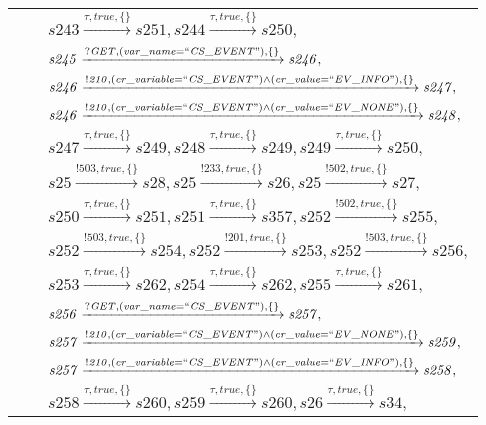 \begin{tabular}{lcp{350px}}
& & $\mathit{s243}\xrightarrow{\mathit{\tau}, \mathit{true}, \{\}}\mathit{s251},\mathit{s244}\xrightarrow{\mathit{\tau}, \mathit{true}, \{\}}\mathit{s250},$ \\
& & $\mathit{s245}\xrightarrow{\mathit{?GET}, \mathit{(var\_name = ``CS\_EVENT")}, \{\}}\mathit{s246},$ \\
& & $\mathit{s246}\xrightarrow{\mathit{!210}, \mathit{(cr\_variable = ``CS\_EVENT") \land (cr\_value = ``EV\_INFO")}, \{\}}\mathit{s247},$ \\
& & $\mathit{s246}\xrightarrow{\mathit{!210}, \mathit{(cr\_variable = ``CS\_EVENT") \land (cr\_value = ``EV\_NONE")}, \{\}}\mathit{s248},$ \\
& & $\mathit{s247}\xrightarrow{\mathit{\tau}, \mathit{true}, \{\}}\mathit{s249},\mathit{s248}\xrightarrow{\mathit{\tau}, \mathit{true}, \{\}}\mathit{s249},\mathit{s249}\xrightarrow{\mathit{\tau}, \mathit{true}, \{\}}\mathit{s250},$ \\
& & $\mathit{s25}\xrightarrow{\mathit{!503}, \mathit{true}, \{\}}\mathit{s28},\mathit{s25}\xrightarrow{\mathit{!233}, \mathit{true}, \{\}}\mathit{s26},\mathit{s25}\xrightarrow{\mathit{!502}, \mathit{true}, \{\}}\mathit{s27},$ \\
& & $\mathit{s250}\xrightarrow{\mathit{\tau}, \mathit{true}, \{\}}\mathit{s251},\mathit{s251}\xrightarrow{\mathit{\tau}, \mathit{true}, \{\}}\mathit{s357},\mathit{s252}\xrightarrow{\mathit{!502}, \mathit{true}, \{\}}\mathit{s255},$ \\
& & $\mathit{s252}\xrightarrow{\mathit{!503}, \mathit{true}, \{\}}\mathit{s254},\mathit{s252}\xrightarrow{\mathit{!201}, \mathit{true}, \{\}}\mathit{s253},\mathit{s252}\xrightarrow{\mathit{!503}, \mathit{true}, \{\}}\mathit{s256},$ \\
& & $\mathit{s253}\xrightarrow{\mathit{\tau}, \mathit{true}, \{\}}\mathit{s262},\mathit{s254}\xrightarrow{\mathit{\tau}, \mathit{true}, \{\}}\mathit{s262},\mathit{s255}\xrightarrow{\mathit{\tau}, \mathit{true}, \{\}}\mathit{s261},$ \\
& & $\mathit{s256}\xrightarrow{\mathit{?GET}, \mathit{(var\_name = ``CS\_EVENT")}, \{\}}\mathit{s257},$ \\
& & $\mathit{s257}\xrightarrow{\mathit{!210}, \mathit{(cr\_variable = ``CS\_EVENT") \land (cr\_value = ``EV\_NONE")}, \{\}}\mathit{s259},$ \\
& & $\mathit{s257}\xrightarrow{\mathit{!210}, \mathit{(cr\_variable = ``CS\_EVENT") \land (cr\_value = ``EV\_INFO")}, \{\}}\mathit{s258},$ \\
& & $\mathit{s258}\xrightarrow{\mathit{\tau}, \mathit{true}, \{\}}\mathit{s260},\mathit{s259}\xrightarrow{\mathit{\tau}, \mathit{true}, \{\}}\mathit{s260},\mathit{s26}\xrightarrow{\mathit{\tau}, \mathit{true}, \{\}}\mathit{s34},$ \\

\end{tabular}
